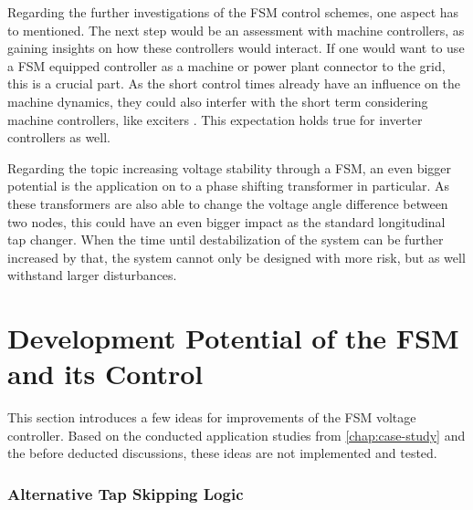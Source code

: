 Regarding the further investigations of the \acs{FSM} control schemes, one aspect has to mentioned.
The next step would be an assessment with machine controllers, as gaining insights on how these controllers would interact.
If one would want to use a \acs{FSM} equipped controller as a machine or power plant connector to the grid, this is a crucial part.
As the short control times already have an influence on the machine dynamics, they could also interfer with the short term considering machine controllers, like exciters \autocite{machowski_2020}.
This expectation holds true for inverter controllers as well.

Regarding the topic increasing voltage stability through a \acs{FSM}, an even bigger potential is the application on to a phase shifting transformer in particular.
As these transformers are also able to change the voltage angle difference between two nodes, this could have an even bigger impact as the standard longitudinal tap changer.
When the time until destabilization of the system can be further increased by that, the system cannot only be designed with more risk, but as well withstand larger disturbances.
    
\section{Development Potential of the FSM and its Control}
\label{sec:experimental-modeling}

This section introduces a few ideas for improvements of the \acs{FSM} voltage controller.
Based on the conducted application studies from \autoref{chap:case-study} and the before deducted discussions, these ideas are not implemented and tested.

\subsubsection{Alternative Tap Skipping Logic}
\label{sec:modeling-alt-tap-skip}

